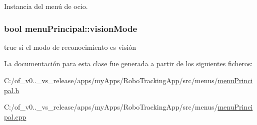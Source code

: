 Instancia del menú de ocio. 

\hypertarget{classmenu_principal_a4fe6b875a2b261f24768a479b725c855}{}
\subsubsection[{vision\+Mode}]{\setlength{\rightskip}{0pt plus 5cm}bool menu\+Principal\+::vision\+Mode}\label{classmenu_principal_a4fe6b875a2b261f24768a479b725c855}


true si el modo de reconocimiento es visión 



La documentación para esta clase fue generada a partir de los siguientes ficheros\+:\begin{DoxyCompactItemize}
\item 
C\+:/of\+\_\+v0..\+\_\+vs\+\_\+release/apps/my\+Apps/\+Robo\+Tracking\+App/src/menus/\hyperlink{menu_principal_8h}{menu\+Principal.\+h}\item 
C\+:/of\+\_\+v0..\+\_\+vs\+\_\+release/apps/my\+Apps/\+Robo\+Tracking\+App/src/menus/\hyperlink{menu_principal_8cpp}{menu\+Principal.\+cpp}\end{DoxyCompactItemize}
